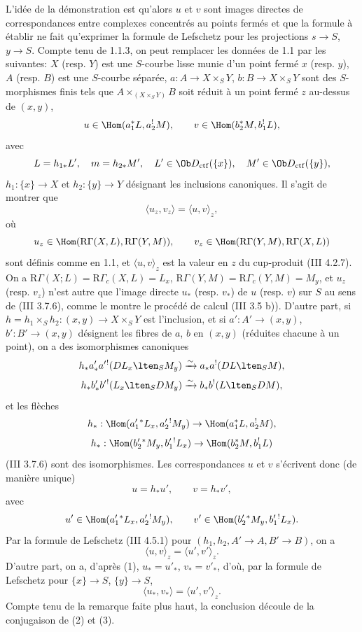 L'idée de la démonstration est qu'alors $u$ et $v$ sont images directes de correspondances entre complexes concentrés au points fermés et que la formule à établir ne fait qu'exprimer la formule de Lefschetz pour les projections $s\to S$, $y\to S$. Compte tenu de 1.1.3, on peut remplacer les données de 1.1 par les suivantes: $X$ (resp. $Y$) est une $S$-courbe lisse munie d'un point fermé $x$ (resp. $y$), $A$ (resp. $B$) est une $S$-courbe séparée, $a:A\to X\times_S Y$, $b:B\to X\times_S Y$ sont des $S$-morphismes finis tels que $A\times_{(X\times_SY)}B$ soit réduit à un point fermé $z$ au-dessus de $(x,y)$,
\[
u\in\Hom(a_1^*L,a_2^!M),\qquad v\in\Hom(b_2^*M,b_1^!L),
\]
avec
\[
L=h_{1*}L',\quad m=h_{2*}M',\quad
L'\in\Ob D_{\mathrm{ctf}}(\{x\}),\quad M'\in\Ob D_{\mathrm{ctf}}(\{y\}),
\]
$h_1:\{x\}\to X$ et $h_2:\{y\}\to Y$
désignant les inclusions canoniques. Il s'agit de montrer que
\[
\langle u_z,v_z\rangle=\langle u,v\rangle_z,
\]
où
\[
u_z\in\Hom(\mathrm{R}\Gamma(X,L),\mathrm{R}\Gamma(Y,M)),\qquad
v_z\in\Hom(\mathrm{R}\Gamma(Y,M),\mathrm{R}\Gamma(X,L))
\]
sont définis comme en 1.1, et $\langle u,v\rangle_z$ est la valeur en $z$ du cup-produit (III 4.2.7). On a $\mathrm{R}\Gamma(X;L)=\mathrm{R}\Gamma_c(X,L)=L_x$, $\mathrm{R}\Gamma(Y,M)=\mathrm{R}\Gamma_c(Y,M)=M_y$, et $u_z$ (resp. $v_z$) n'est autre que l'image directe $u_*$ (resp. $v_*$) de $u$ (resp. $v$) sur $S$ au sens de (III 3.7.6), comme le montre le procédé de calcul (III 3.5 b)). D'autre part, si $h=h_1\times_Sh_2:(x,y)\to X\times_SY$ est l'inclusion, et si $a':A'\to(x,y)$, $b':B'\to(x,y)$ désignent les fibres de $a$, $b$ en $(x,y)$ (réduites chacune à un point), on a des isomorphismes canoniques
\[
h_*a'_*a'{}^!(DL_x\lten_SM_y)
 \xrightarrow{\sim} a_*a^!(DL\lten_SM),
\]
\[
h_*b'_*b'{}^!(L_x\lten_SDM_y)
 \xrightarrow{\sim} b_*b^!(L\lten_SDM),
\]
et les flèches
\[
h_*:\Hom(a_1'{}^*L_x,a_2'{}^!M_y)\to \Hom(a_1^*L,a_2^!M),
\]
\[
h_*:\Hom(b_2'{}^*M_y,b_1'{}^!L_x)\to \Hom(b_2^*M,b_1^!L)
\]
(III 3.7.6) sont des isomorphismes. Les correspondances $u$ et $v$ s'écrivent donc (de manière unique)
\begin{equation}\tag{1}
u=h_*u',\qquad v=h_*v',
\end{equation}
avec
\[
u'\in\Hom(a_1'{}^*L_x,a_2'{}^!M_y),\qquad
v'\in\Hom(b_2'{}^*M_y,b_1'{}^!L_x).
\]
Par la formule de Lefschetz (III 4.5.1) pour $(h_1,h_2,A'\to A,B'\to B)$, on a
\begin{equation}\tag{2}
\langle u,v\rangle_z=\langle u',v'\rangle_z .
\end{equation}
D'autre part, on a, d'après (1), $u_*=u'_*$, $v_*=v'_*$, d'où, par la formule de Lefschetz pour $\{x\}\to S$, $\{y\}\to S$,
\begin{equation}\tag{3}
\langle u_*,v_*\rangle=\langle u',v'\rangle_z .
\end{equation}
Compte tenu de la remarque faite plus haut, la conclusion découle de la conjugaison de (2) et (3).

